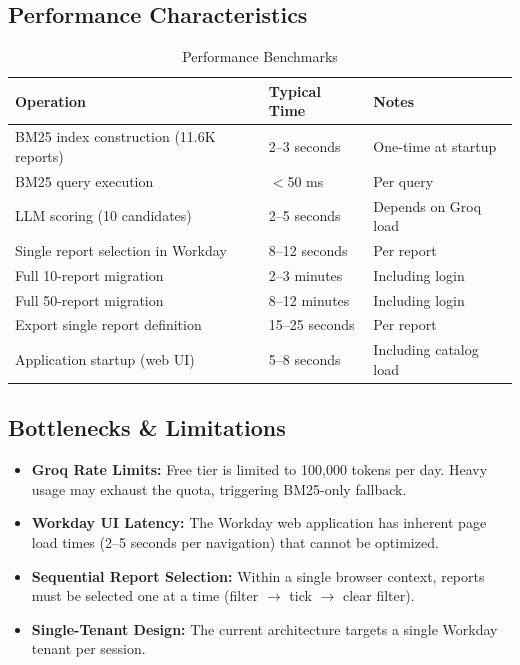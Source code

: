 \documentclass[12pt,a4paper]{article}
\begin{document}
\subsection{Performance Characteristics}
\label{subsec:perf-characteristics}

\begin{table}[H]
\centering
\caption{Performance Benchmarks}
\label{tab:performance}
\begin{tabularx}{\textwidth}{X l l}
\toprule
\textbf{Operation} & \textbf{Typical Time} & \textbf{Notes} \\
\midrule
BM25 index construction (11.6K reports) & 2--3 seconds & One-time at startup \\
BM25 query execution & $<$50 ms & Per query \\
LLM scoring (10 candidates) & 2--5 seconds & Depends on Groq load \\
Single report selection in Workday & 8--12 seconds & Per report \\
Full 10-report migration & 2--3 minutes & Including login \\
Full 50-report migration & 8--12 minutes & Including login \\
Export single report definition & 15--25 seconds & Per report \\
Application startup (web UI) & 5--8 seconds & Including catalog load \\
\bottomrule
\end{tabularx}
\end{table}

\subsection{Bottlenecks \& Limitations}
\label{subsec:bottlenecks}

\begin{itemize}[leftmargin=2em]
  \item \textbf{Groq Rate Limits:} Free tier is limited to 100,000 tokens per day. Heavy usage may exhaust the quota, triggering BM25-only fallback.
  \item \textbf{Workday UI Latency:} The Workday web application has inherent page load times (2--5 seconds per navigation) that cannot be optimized.
  \item \textbf{Sequential Report Selection:} Within a single browser context, reports must be selected one at a time (filter $\rightarrow$ tick $\rightarrow$ clear filter).
  \item \textbf{Single-Tenant Design:} The current architecture targets a single Workday tenant per session.
\end{itemize}
\end{document}
